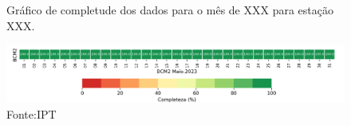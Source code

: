 
\begin{figure}[h]
    \centering
    \caption{Gráfico de completude dos dados para o mês de XXX para estação XXX.}
    \includegraphics[width=1.0\textwidth]{../figuras/completude.png} %
    \caption*{Fonte:IPT}
\end{figure}
